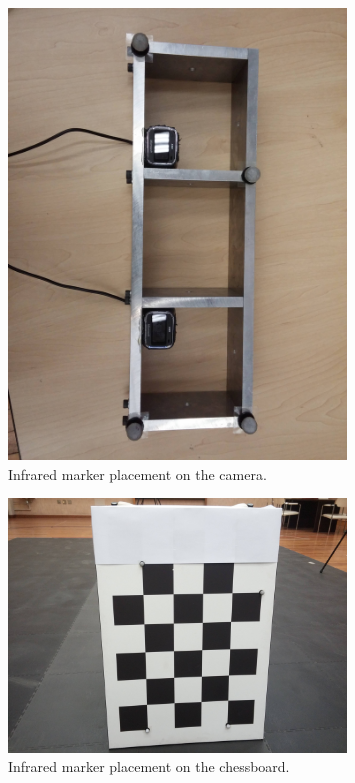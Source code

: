\begin{figure}
   \centering 
   \includegraphics[width=0.8\textwidth]{figures/chapter3/cam_1_low}
   \caption{Infrared marker placement on the camera.}
\label{fig:cam-marker-placement}
\end{figure}

\begin{figure}
   \centering 
   \includegraphics[width=0.8\textwidth]{figures/chapter3/bord_2_low}
   \caption{Infrared marker placement on the chessboard.}
\label{fig:board-marker-placement}
\end{figure}

